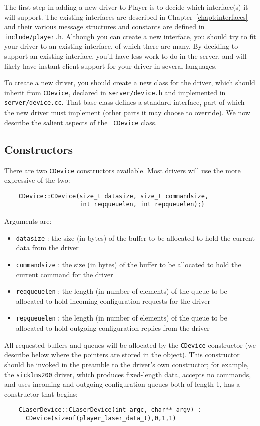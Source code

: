 \documentclass[11pt]{report}
\begin{document}
The first step in adding a new driver to Player is to decide which
interface(s) it will support.  The existing interfaces are described in
Chapter~\ref{chapt:interfaces} and their various message structures and
constants are defined in {\tt include/player.h}.  Although you can create a
new interface, you should try to fit your driver to an existing interface,
of which there are many.  By deciding to support an existing interface,
you'll have less work to do in the server, and will likely have instant
client support for your driver in several languages.

To create a new driver, you should create a new class for the driver, which
should inherit from {\tt CDevice}, declared in {\tt server/device.h} and
implemented in {\tt server/device.cc}.  That base class defines a standard
interface, part of which the new driver must implement (other parts it
may choose to override).  We now describe the salient aspects of the {\tt
CDevice} class.

\subsection{Constructors}
There are two {\tt CDevice} constructors available.  Most drivers will
use the more expressive of the two:
\begin{verbatim}
    CDevice::CDevice(size_t datasize, size_t commandsize, 
                     int reqqueuelen, int repqueuelen);}
\end{verbatim}
Arguments are:
\begin{itemize}
\item {\tt datasize} : the size (in bytes) of the buffer to be allocated to 
hold the current data from the driver
\item {\tt commandsize} : the size (in bytes) of the buffer to be allocated to 
hold the current command for the driver
\item {\tt reqqueuelen} : the length (in number of elements) of the queue 
to be allocated to hold incoming configuration requests for the driver
\item {\tt repqueuelen} : the length (in number of elements) of the queue to 
be allocated to hold outgoing configuration replies from the driver
\end{itemize}
All requested buffers and queues will be allocated by the {\tt CDevice}
constructor (we describe below where the pointers are stored in the object).
This constructor should be  invoked in the preamble to the driver's own
constructor; for example, the {\tt sicklms200} driver, which produces 
fixed-length data, accepts no commands, and uses incoming and outgoing 
configuration queues both of length 1, has a constructor that begins:
\begin{verbatim}
    CLaserDevice::CLaserDevice(int argc, char** argv) : 
      CDevice(sizeof(player_laser_data_t),0,1,1)
\end{verbatim}
\end{document}
